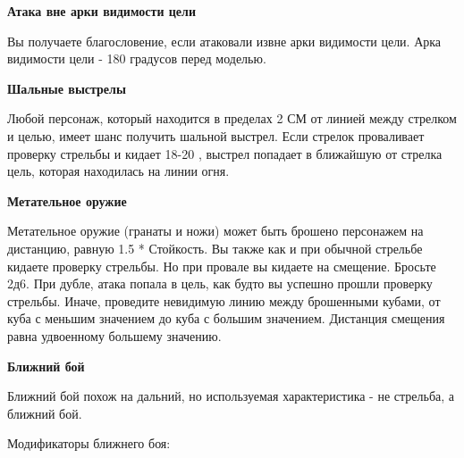     \begin{multicols}{2}
        \textbf{Атака вне арки видимости цели}

        Вы получаете благословение, если атаковали извне арки видимости цели. Арка видимости цели - 180 градусов перед моделью.

        \textbf{Шальные выстрелы}

        Любой персонаж, который находится в пределах 2 СМ от линией между стрелком и целью, имеет шанс получить шальной выстрел. 
        Если стрелок проваливает проверку стрельбы и кидает 18-20 , выстрел попадает в ближайшую от стрелка цель, которая 
        находилась на линии огня.

        \textbf{Метательное оружие}

        Метательное оружие (гранаты и ножи) может быть брошено персонажем на дистанцию, равную 1.5 * Стойкость. Вы также как 
        и при обычной стрельбе кидаете проверку стрельбы. Но при провале вы кидаете на смещение. Бросьте 2д6. При дубле, 
        атака попала в цель, как будто вы успешно прошли проверку стрельбы. Иначе, проведите невидимую линию между брошенными 
        кубами, от куба с меньшим значением до куба с большим значением. Дистанция смещения равна удвоенному большему значению.
    \end{multicols}

    \newpage

    \textbf{Ближний бой}

    Ближний бой похож на дальний, но используемая характеристика - не стрельба, а ближний бой.

    Модификаторы ближнего боя:

